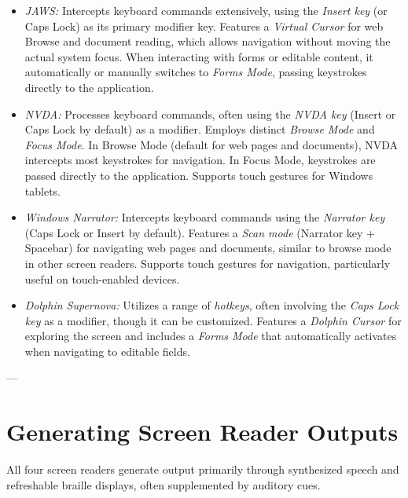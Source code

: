 \begin{itemize}
    \item \emph{JAWS:} Intercepts keyboard commands extensively, using the \emph{Insert key} (or Caps Lock) as its primary modifier key.\cite{JAWSBasicCommands} Features a \emph{Virtual Cursor} for web Browse and document reading, which allows navigation without moving the actual system focus. When interacting with forms or editable content, it automatically or manually switches to \emph{Forms Mode}, passing keystrokes directly to the application.\cite{JAWSKeyboardGestures}
    \item \emph{NVDA:} Processes keyboard commands, often using the \emph{NVDA key} (Insert or Caps Lock by default) as a modifier.\cite{NVDAKeyboardCommands} Employs distinct \emph{Browse Mode} and \emph{Focus Mode}. In Browse Mode (default for web pages and documents), NVDA intercepts most keystrokes for navigation. In Focus Mode, keystrokes are passed directly to the application. Supports touch gestures for Windows tablets.\cite{NVDAKeyboardCommands}
    \item \emph{Windows Narrator:} Intercepts keyboard commands using the \emph{Narrator key} (Caps Lock or Insert by default).\cite{NarratorKeyboardCommands} Features a \emph{Scan mode} (Narrator key + Spacebar) for navigating web pages and documents, similar to browse mode in other screen readers. Supports touch gestures for navigation, particularly useful on touch-enabled devices.\cite{NarratorGuide}
    \item \emph{Dolphin Supernova:} Utilizes a range of \emph{hotkeys}, often involving the \emph{Caps Lock key} as a modifier, though it can be customized.\cite{SuperNovaHotkeys} Features a \emph{Dolphin Cursor} for exploring the screen and includes a \emph{Forms Mode} that automatically activates when navigating to editable fields.\cite{SuperNovaHotkeys}
\end{itemize}

---

\section{Generating Screen Reader Outputs}
\label{sec:generating-outputs}

All four screen readers generate output primarily through synthesized speech and refreshable braille displays, often supplemented by auditory cues.

